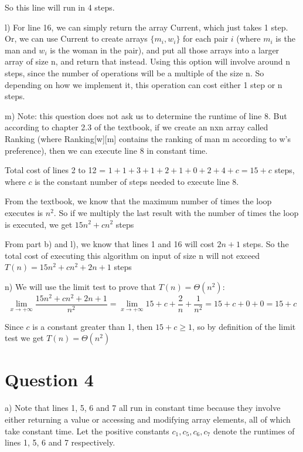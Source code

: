 \documentclass{article}
\begin{document}
So this line will run in 4 steps.

l) For line 16, we can simply return the array Current, which just takes 1 step. Or, we can use Current to create arrays $\{m_i, w_i\}$ for each pair $i$ (where $m_i$ is the man and $w_i$ is the woman in the pair), and put all those arrays into a larger array of size n, and return that instead. Using this option will involve around n steps, since the number of operations will be a multiple of the size n. So depending on how we implement it, this operation can cost either 1 step or n steps.

m) Note: this question does not ask us to determine the runtime of line 8. But according to chapter 2.3 of the textbook, if we create an nxn array called Ranking (where Ranking[w][m] contains the ranking of man m according to w's preference), then we can execute line 8 in constant time.

Total cost of lines 2 to 12 = $1+1+3+1+2+1+0+2+4+c = 15 + c$ steps, where $c$ is the constant number of steps needed to execute line 8.

From the textbook, we know that the maximum number of times the loop executes is $n^2$. So if we multiply the last result with the number of times the loop is executed, we get $15n^2 + cn^2$ steps

From part b) and l), we know that lines 1 and 16 will cost $2n+1$ steps. 
So the total cost of executing this algorithm on input of size n will not exceed $T(n) = 15n^2+ cn^2 + 2n + 1$ steps

n) We will use the limit test to prove that $T(n) = \Theta(n^2)$:
\[\lim_{x \to +\infty} \frac{15n^2 + cn^2 + 2n + 1}{n^2} = \lim_{x \to +\infty} 15 + c + \frac{2}{n} + \frac{1}{n^2} = 15 + c + 0 +0 = 15 + c\]

Since $c$ is a constant greater than 1, then $15 + c \geq 1$, so by definition of the limit test we get $T(n) = \Theta(n^2)$

\section*{Question 4}

a) 
Note that lines 1, 5, 6 and 7 all run in constant time because they involve either returning a value or accessing and modifying array elements, all of which take constant time.
Let the positive constants $c_1, c_5, c_6, c_7$ denote the runtimes of lines 1, 5, 6 and 7 respectively.
\end{document}
